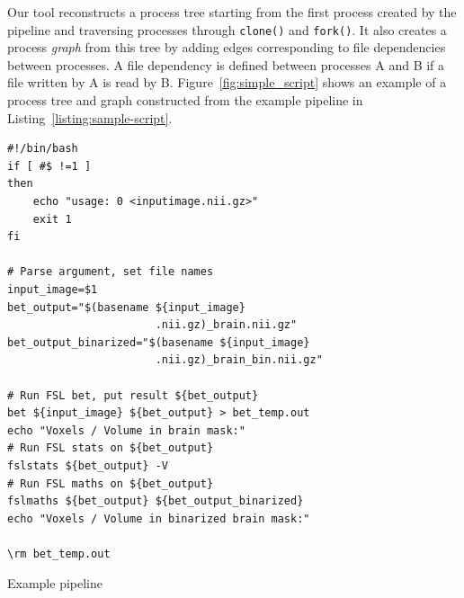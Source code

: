 \documentclass[a4paper,num-refs]{oup-contemporary}
\begin{document}
Our tool reconstructs a process tree starting from the first process
created by the pipeline and traversing processes through \texttt{clone()}
and \texttt{fork()}. It also creates a process \emph{graph} from this tree
by adding edges corresponding to file dependencies between processes. A
file dependency is defined between processes A and B if a file written by A
is read by B. Figure~\ref{fig:simple_script} shows an example of a process
tree and graph constructed from the example pipeline in
Listing~\ref{listing:sample-script}.
\begin{listing}
\begin{verbatim}
#!/bin/bash
if [ #$ !=1 ]
then
    echo "usage: 0 <inputimage.nii.gz>"
    exit 1
fi

# Parse argument, set file names
input_image=$1
bet_output="$(basename ${input_image} 
                       .nii.gz)_brain.nii.gz"
bet_output_binarized="$(basename ${input_image} 
                       .nii.gz)_brain_bin.nii.gz"

# Run FSL bet, put result ${bet_output}
bet ${input_image} ${bet_output} > bet_temp.out
echo "Voxels / Volume in brain mask:"
# Run FSL stats on ${bet_output}
fslstats ${bet_output} -V
# Run FSL maths on ${bet_output}
fslmaths ${bet_output} ${bet_output_binarized}
echo "Voxels / Volume in binarized brain mask:"

\rm bet_temp.out
\end{verbatim}
  \caption{Example pipeline}
  \label{listing:sample-script}
\end{listing}
\end{document}
